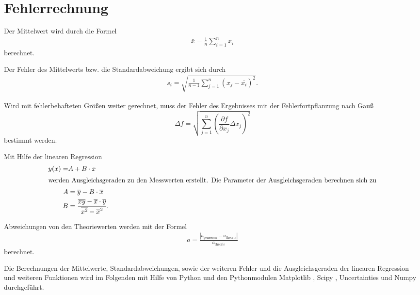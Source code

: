 \section{Fehlerrechnung}
\label{sec:Fehlerrechnung}

Der Mittelwert wird durch die Formel
\begin{align*}
    \bar{x}=\frac{1}{n} \sum_{i=1}^n x_i \label{eqn:Mittelwert}
\end{align*}
berechnet.

Der Fehler des Mittelwerts bzw. die Standardabweichung ergibt sich durch
\begin{align*}
    s_i=\sqrt{\frac{1}{n-1}\sum_{j=1}^n (x_j-\bar{x_i})^2}.
\end{align*}

Wird mit fehlerbehafteten Größen weiter gerechnet, muss der Fehler des Ergebnisses mit der Fehlerfortpflanzung nach Gauß
\begin{equation*}
    \Delta f=\sqrt{\sum_{j=1}^n \left(\frac{\partial f}{\partial x_j}\Delta x_j \right)^{2} }\label{eqn:Gauß}
\end{equation*}
bestimmt werden.

Mit Hilfe der linearen Regression 
\begin{subequations}
    \label{eqn:lin}
\begin{align}
    y(x)=&A+B\cdot x\\
    \intertext{werden Ausgleichsgeraden zu den Messwerten erstellt. Die Parameter der Ausgleichsgeraden berechnen sich zu}
    A&=\overline{y}-B\cdot \overline{x}\label{eqn:lina}\\
    B&=\frac{\overline{xy}-\overline{x}\cdot \overline{y}}{\overline{x^2}-\overline{x}^2}\label{eqn:linb}.
\end{align}
\end{subequations}

Abweichungen von den Theoriewerten werden mit der Formel
\begin{align}
  a=\frac{|a_\mathrm{gemessen}-a_\mathrm{theorie}|}{a_\mathrm{theorie}} \label{eqn:abweich}
\end{align}
berechnet.

Die Berechnungen der Mittelwerte, Standardabweichungen, sowie der weiteren Fehler und die Ausgleichsgeraden der linearen Regression und weiteren Funktionen
wird im Folgenden mit Hilfe von Python und den Pythonmodulen Matplotlib \cite{matplotlib}, Scipy \cite{scipy}, Uncertainties \cite{uncertainties} und Numpy \cite{numpy}
durchgeführt.